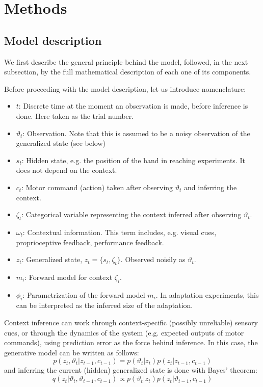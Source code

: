 \documentclass[a4paper,doc,floatsintext,natbib]{apa6}%
\begin{document}
\section{Methods}
\subsection{Model description}
\label{subsection:model-description}
We first describe the general principle behind the model, followed, in the next
subsection, by the full mathematical description of each one of its components.

Before proceeding with the model description, let us introduce nomenclature:
\begin{itemize}
\item $t$: Discrete time at the moment an observation is made, before inference is done. 
Here taken as the trial number.
\item $\vartheta_t$: Observation. Note that this is assumed to be a noisy
observation of the generalized state (see below)
\item $s_t$: Hidden state, e.g. the position of the hand in reaching
experiments. It does not depend on the context.
\item $c_t$: Motor command (action) taken after observing $\vartheta_t$ and inferring the context.
\item $\zeta_t$: Categorical variable representing the context inferred after observing $\vartheta_t$.
\item $\omega_t$: Contextual information. This term includes, e.g. visual cues,
proprioceptive feedback, performance feedback.
\item $z_t$: Generalized state, $z_t = \{s_t, \zeta_t\}$. Observed noisily
as $\vartheta_t$.
\item $m_i$: Forward model for context $\zeta_i$.
\item $\phi_i$: Parametrization of the forward model $m_i$. In adaptation experiments, this
can be interpreted as the inferred size of the adaptation.
\end{itemize}

Context inference can work through context-specific (possibly unreliable) sensory cues,
or through the dynamics of the system (e.g. expected outputs of motor
commands), using prediction error as the force behind inference. In this case,
the generative model can be written as follows:
\[
p(z_t, \vartheta_t | z_{t-1}, c_{t-1}) = p(\vartheta_t | z_t)p(z_t|z_{t-1}, c_{t-1})
\]
and inferring the current (hidden) generalized state is done with Bayes' theorem:
\[
  q(z_t | \vartheta_t, \vartheta_{t-1}, c_{t-1}) \propto p(\vartheta_t | z_t)p(z_t|\vartheta_{t-1}, c_{t-1})
\]
  
\end{document}
